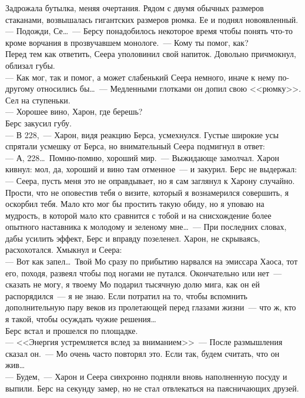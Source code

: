 Задрожала бутылка, меняя очертания. Рядом с двумя обычных размеров стаканами, 
возвышалась гигантских размеров рюмка. Ее и поднял новоявленный.\\
--- Подожди, Се\ldots~--- Берсу понадобилось некоторое время чтобы понять что-то 
кроме ворчания в прозвучавшем монологе.~--- Кому ты помог, как?\\
Перед тем как ответить, Сеера уполовинил свой напиток. Довольно причмокнул, 
облизал губы.\\
--- Как мог, так и помог, а может слабенький Сеера немного, иначе к нему 
по-другому относились бы\ldots~--- Медленными глотками он допил свою <<рюмку>>. 
Сел на ступеньки.\\
--- Хорошее вино, Харон, где берешь?\\
Берс закусил губу.\\
--- В 228,~--- Харон, видя реакцию Берса, усмехнулся. Густые широкие усы спрятали 
усмешку от Берса, но внимательный Сеера подмигнул в ответ:\\
--- А, 228\ldots\ Помню-помню, хороший мир.~--- Выжидающе замолчал. Харон кивнул: 
мол, да, хороший и вино там отменное~--- и закурил. Берс не выдержал:\\
--- Сеера, пусть меня это не оправдывает, но я сам заглянул к Харону случайно. 
Прости, что не оповестив тебя о визите, который я вознамерился совершить, я 
оскорбил тебя. Мало кто мог бы простить такую обиду, но я уповаю на мудрость, в 
которой мало кто сравнится с тобой и на снисхождение более опытного наставника 
к молодому и зеленому мне\ldots~--- При последних словах, дабы усилить эффект, 
Берс и вправду позеленел. Харон, не скрываясь, расхохотался. Хмыкнул и Сеера:\\
--- Вот как запел\ldots\ Твой Мо сразу по прибытию нарвался на эмиссара Хаоса, 
тот его, походя, развеял чтобы под ногами не путался. Окончательно или нет~--- 
сказать не могу, я твоему Мо подарил тысячную долю мига, как он ей распорядился~--- я 
не знаю. Если потратил на то, чтобы вспомнить дополнительную пару веков из 
пролетающей перед глазами жизни~--- что ж, кто я такой, чтобы осуждать чужие 
решения\ldots\\
Берс встал и прошелся по площадке.\\
--- <<Энергия устремляется вслед за вниманием>>~--- После размышления сказал 
он.~--- Мо очень часто повторял это. Если так, будем считать, что он жив\ldots\\
--- Будем,~--- Харон и Сеера синхронно подняли вновь наполненную посуду и выпили. 
Берс на секунду замер, но не стал отвлекаться на паясничающих друзей.\\
